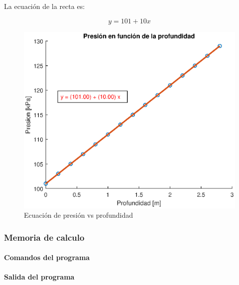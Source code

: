 \documentclass[letter,11pt]{article}
\begin{document}
La ecuación de la recta es:

\begin{equation}
    y = 101 + 10 x
\end{equation}

\begin{figure}[!h]
\centering
\includegraphics[scale=1.00]{eps/3.2.2.eps}
\caption{Ecuación de presión vs profundidad}
\label{practica42_2}
\end{figure}

\subsubsection{Memoria de calculo}

\paragraph{Comandos del programa}
\begin{alltt}
\footnotesize

\normalsize
\end{alltt}

\paragraph{Salida del programa}
\begin{alltt}
\footnotesize

\normalsize
\end{alltt}

\newpage
\end{document}
